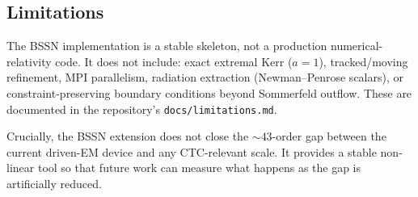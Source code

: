 \subsection{Limitations}

The BSSN implementation is a stable skeleton, not a production
numerical-relativity code. It does not include: exact extremal Kerr
($a = 1$), tracked/moving refinement, MPI parallelism, radiation
extraction (Newman--Penrose scalars), or constraint-preserving
boundary conditions beyond Sommerfeld outflow. These are documented
in the repository's \texttt{docs/limitations.md}.

Crucially, the BSSN extension does not close the $\sim 43$-order gap
between the current driven-EM device and any CTC-relevant scale. It
provides a stable non-linear tool so that future work can measure
what happens as the gap is artificially reduced.
